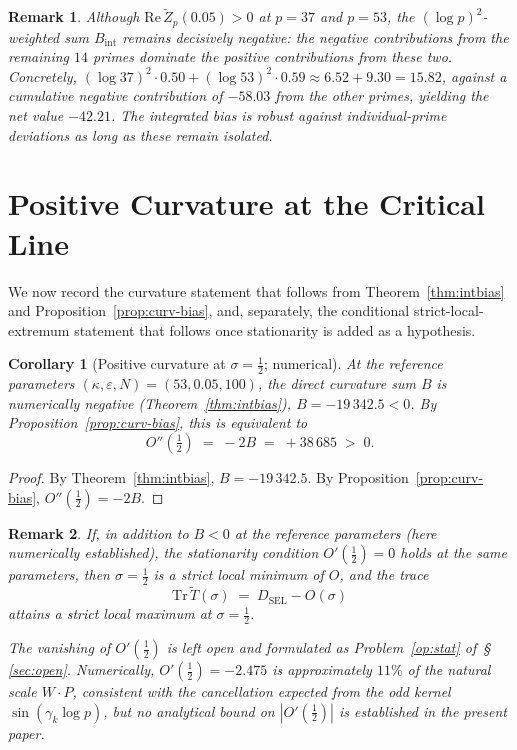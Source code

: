 \documentclass[11pt]{article}
\newtheorem{corollary}[theorem]{Corollary}
\newtheorem*{remark}{Remark}
\newcommand{\Tt}{\widetilde{T}}
\newcommand{\Zt}{\widetilde{Z}}
\newcommand{\DSEL}{D_{\mathrm{SEL}}}
\begin{document}
\begin{remark}
Although $\mathrm{Re}\,\Zt_p(0.05)>0$ at $p=37$ and $p=53$, the
$(\log p)^2$-weighted sum $B_{\mathrm{int}}$ remains decisively
negative: the negative contributions from the remaining $14$ primes
dominate the positive contributions from these two.
Concretely, $(\log 37)^2\cdot 0.50+(\log 53)^2\cdot 0.59\approx
6.52+9.30=15.82$, against a cumulative negative contribution of
$-58.03$ from the other primes, yielding the net value $-42.21$.
The integrated bias is robust against individual-prime deviations as
long as these remain isolated.
\end{remark}

\section{Positive Curvature at the Critical Line}
\label{sec:curvcor}

We now record the curvature statement that follows from
Theorem~\ref{thm:intbias} and Proposition~\ref{prop:curv-bias}, and,
separately, the conditional strict-local-extremum statement that
follows once stationarity is added as a hypothesis.

\begin{corollary}[Positive curvature at $\sigma=\tfrac12$; numerical]
\label{cor:curvature}
At the reference parameters $(\kappa,\varepsilon,N)=(53,0.05,100)$,
the direct curvature sum $B$ is numerically negative
(Theorem~\ref{thm:intbias}), $B=-19\,342.5<0$.
By Proposition~\ref{prop:curv-bias}, this is equivalent to
\[
O''(\tfrac12) \;=\; -2B \;=\; +38\,685 \;>\; 0.
\]
\end{corollary}

\begin{proof}
By Theorem~\ref{thm:intbias}, $B=-19\,342.5$.
By Proposition~\ref{prop:curv-bias}, $O''(\tfrac12)=-2B$.
\end{proof}

\begin{remark}
If, in addition to $B<0$ at the reference parameters (here numerically
established), the stationarity condition $O'(\tfrac12)=0$ holds at the
same parameters, then $\sigma=\tfrac12$ is a strict local minimum of
$O$, and the trace
\[
\mathrm{Tr}\,\Tt(\sigma) \;=\; \DSEL - O(\sigma)
\]
attains a strict local maximum at $\sigma=\tfrac12$.

The vanishing of $O'(\tfrac12)$ is left open and formulated as
Problem~\ref{op:stat} of~\S\,\ref{sec:open}.
Numerically, $O'(\tfrac12)=-2.475$ is approximately $11\%$ of the
natural scale $W\cdot P$, consistent with the cancellation expected
from the odd kernel $\sin(\gamma_k\log p)$, but no analytical bound on
$|O'(\tfrac12)|$ is established in the present paper.
\end{remark}
\end{document}
